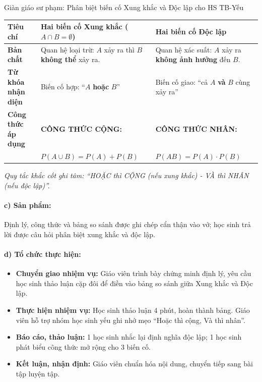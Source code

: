 \documentclass[12pt, a4paper]{article}
\begin{document}
\begin{scaffoldbox}{Giàn giáo sư phạm: Phân biệt biến cố Xung khắc và Độc lập cho HS TB-Yếu}
\begin{center}
\small
\begin{tabularx}{\linewidth}{|l|X|X|}
\hline
\textbf{Tiêu chí} & \textbf{Hai biến cố Xung khắc ($A \cap B = \emptyset$)} & \textbf{Hai biến cố Độc lập} \\ \hline
\textbf{Bản chất} & Quan hệ loại trừ: $A$ xảy ra thì $B$ \textbf{không thể} xảy ra. & Quan hệ xác suất: $A$ xảy ra \textbf{không ảnh hưởng} đến $B$. \\ \hline
\textbf{Từ khóa nhận diện} & Biến cố hợp: ``$A$ \textbf{hoặc} $B$'' & Biến cố giao: ``cả $A$ \textbf{và} $B$ cùng xảy ra'' \\ \hline
\textbf{Công thức áp dụng} & \textbf{CÔNG THỨC CỘNG:} & \textbf{CÔNG THỨC NHÂN:} \\ 
& $P(A \cup B) = P(A) + P(B)$ & $P(AB) = P(A) \cdot P(B)$ \\ \hline
\end{tabularx}
\end{center}
\textit{Quy tắc khắc cốt ghi tâm: ``HOẶC thì CỘNG (nếu xung khắc) - VÀ thì NHÂN (nếu độc lập)''.}
\end{scaffoldbox}

\paragraph{c) Sản phẩm:} Định lý, công thức và bảng so sánh được ghi chép cẩn thận vào vở; học sinh trả lời được câu hỏi phân biệt xung khắc và độc lập.

\paragraph{d) Tổ chức thực hiện:}
\begin{itemize}[leftmargin=0.8cm]
    \item \textbf{Chuyển giao nhiệm vụ:} Giáo viên trình bày chứng minh định lý, yêu cầu học sinh thảo luận cặp đôi để điền vào bảng so sánh giữa Xung khắc và Độc lập.
    \item \textbf{Thực hiện nhiệm vụ:} Học sinh thảo luận 4 phút, hoàn thành bảng. Giáo viên hỗ trợ nhóm học sinh yếu ghi nhớ mẹo ``Hoặc thì cộng, Và thì nhân''.
    \item \textbf{Báo cáo, thảo luận:} 1 học sinh nhắc lại định nghĩa độc lập; 1 học sinh phát biểu công thức mở rộng cho 3 biến cố.
    \item \textbf{Kết luận, nhận định:} Giáo viên chuẩn hóa nội dung, chuyển tiếp sang bài tập luyện tập.
\end{itemize}
\end{document}
